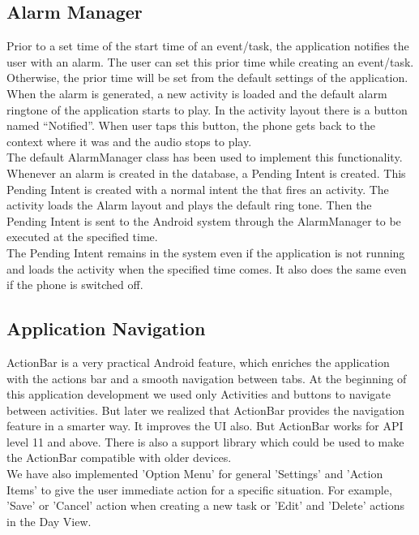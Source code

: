 \documentclass[10pt,a4paper]{report}
\begin{document}
\subsection{Alarm Manager}

Prior to a set time of the start time of an event/task, the application notifies the user with an alarm. The user can set this prior time while creating an event/task. Otherwise, the prior time will be set from the default settings of the application. When the alarm is generated, a new activity is loaded and the default alarm ringtone of the application starts to play. In the activity layout there is a button named “Notified”. When user taps this button, the phone gets back to the context where it was and the audio stops to play.\\

The default AlarmManager class has been used to implement this functionality. Whenever an alarm is created in the database, a Pending Intent is created. This Pending Intent is created with a normal intent the that fires an activity. The activity loads the Alarm layout and plays the default ring tone. Then the Pending Intent is sent to the Android system through the AlarmManager to be executed at the specified time. \\

The Pending Intent remains in the system even if the application is not running and loads the activity when the specified time comes. It also does the same even if the phone is switched off. 

\subsection{Application Navigation}

ActionBar is a very practical Android feature, which enriches the application with the actions bar and a smooth navigation between tabs. At the beginning of this application development we used only Activities and buttons to navigate between activities. But later we realized that ActionBar provides the navigation feature in a smarter way. It improves the UI also. But ActionBar works for API level 11 and above. There is also a support library which could be used to make the ActionBar compatible with older devices. \\

We have also implemented 'Option Menu' for general 'Settings' and 'Action Items' to give the user immediate action for a specific situation. For example, 'Save' or 'Cancel' action when creating  a new task or 'Edit' and 'Delete' actions in the Day View.
\end{document}
